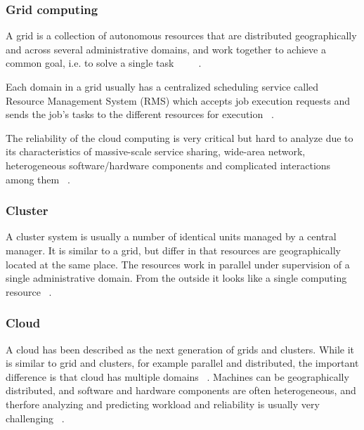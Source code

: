 \documentclass{cslthse-msc}
\begin{document}
\subsubsection{Grid computing}
A grid is a collection of autonomous resources that are distributed geographically and across several administrative domains, and work together to achieve a common goal, i.e. to solve a single task ~\cite{compStudyLoadAndCloud} ~\cite{relAndPerfGridServices} ~\cite{evalOfGridRel}.

Each domain in a grid usually has a centralized scheduling service called Resource Management System (RMS) which accepts job execution requests and sends the job's tasks to the different resources for execution ~\cite{evalOfGridRel}.

The reliability of the cloud computing is very critical but hard to analyze due to its characteristics of massive-scale service sharing, wide-area network, heterogeneous software/hardware components and complicated interactions among them ~\cite{cloudServiceRel}.


\subsubsection{Cluster}
A cluster system is usually a number of identical units managed by a central manager. It is similar to a grid, but differ in that resources are geographically located at the same place. The resources work in parallel under supervision of a single administrative domain. From the outside it looks like a single computing resource ~\cite{compStudyLoadAndCloud}.

\subsubsection{Cloud}
A cloud has been described as the next generation of grids and clusters. While it is similar to grid and clusters, for example parallel and distributed, the important difference is that cloud has multiple domains ~\cite{compStudyLoadAndCloud}. Machines can be geographically distributed, and software and hardware components are often heterogeneous, and therfore analyzing and predicting workload and reliability is usually very challenging ~\cite{surveyReliabilityDistr}. 
\end{document}

